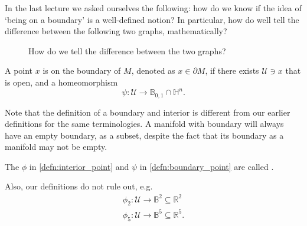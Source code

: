\documentclass[notoc,notitlepage]{tufte-book}
\begin{document}
In the last lecture we asked ourselves the following: how do we know if the
idea of `being on a boundary' is a well-defined notion? In particular, how
do well tell the difference between the following two graphs, mathematically?

\begin{figure}[ht]
  \centering
  \caption{How do we tell the difference between the two graphs?}
  \label{fig:r_n_vs_h_n}
\end{figure}

\begin{defn}\label{defn:boundary_point}
  A point $x$ is on the boundary of $M$, denoted as $x \in \partial M$, if
  there exists $\mathcal{U} \ni x$ that is open, and a homeomorphism
  \begin{equation*}
    \psi : \mathcal{U} \to \mathbb{B}_{0, 1} \cap \mathbb{H}^n.
  \end{equation*}
\end{defn}

\begin{note}
  Note that the definition of a boundary and interior is different from our earlier
  definitions for the same terminologies. A manifold with boundary will always have
  an empty boundary, as a subset, despite the fact that its boundary as a manifold
  may not be empty.
\end{note}

\begin{note}
  The $\phi$ in \cref{defn:interior_point} and $\psi$ in \cref{defn:boundary_point}
  are called .

  Also, our definitions do not rule out, e.g.
  \begin{gather*}
    \phi_2 : \mathcal{U} \to \mathbb{B}^2 \subseteq \mathbb{R}^2 \\
    \phi_5 : \mathcal{U} \to \mathbb{B}^5 \subseteq \mathbb{R}^5.
  \end{gather*}
\end{note}
\end{document}
